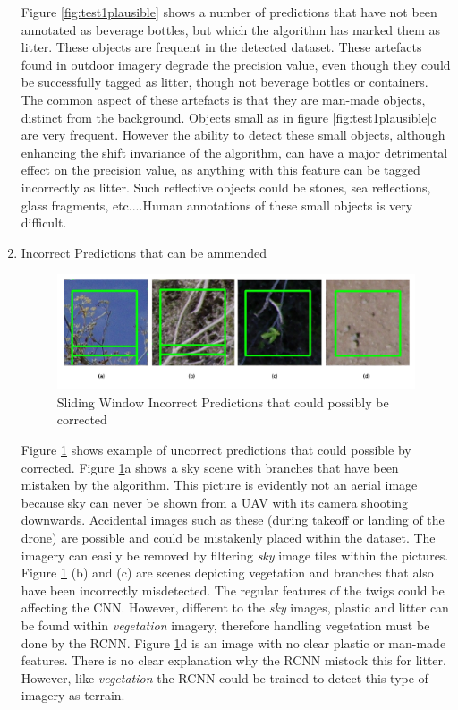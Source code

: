 \documentclass{IEEEtran}
\begin{document}
\begin{enumerate}
Figure \ref{fig:test1plausible} shows a number of predictions that have not been annotated as beverage bottles, but which the algorithm has marked them as litter. These objects are frequent in the detected dataset. These artefacts found in outdoor imagery degrade the precision value, even though they could be successfully tagged as litter, though not beverage bottles or containers. The common aspect of these artefacts is that they are man-made objects, distinct from the background. Objects small as in figure \ref{fig:test1plausible}c are very frequent. However the ability to detect these small objects, although enhancing the shift invariance of the algorithm, can have a major detrimental effect on the precision value, as anything with this feature can be tagged incorrectly as litter. Such reflective objects could be stones, sea reflections, glass fragments, etc....Human annotations of these small objects is very difficult.

\item Incorrect Predictions that can be ammended
\begin{figure}[H]
\centering
\includegraphics[scale=0.4]{images/test1-correctable.png}
\caption{Sliding Window Incorrect Predictions that could possibly be corrected}
\label{fig:test1correctable}
\end{figure}

Figure \ref{fig:test1correctable} shows example of uncorrect predictions that could possible by corrected. Figure \ref{fig:test1correctable}a shows a sky scene with branches that have been mistaken by the algorithm. This picture is evidently not an aerial image because sky can never be shown from a UAV with its camera shooting downwards. Accidental images such as these (during takeoff or landing of the drone) are possible and could be mistakenly placed within the dataset. The imagery can easily be removed by filtering \textit{sky} image tiles within the pictures. Figure \ref{fig:test1correctable} (b) and (c) are scenes  depicting vegetation and branches that also have been incorrectly misdetected. The regular features of the twigs could be affecting the CNN. However, different to the \textit{sky} images, plastic and litter can be found within \textit{vegetation} imagery, therefore handling vegetation must be done by the RCNN. Figure \ref{fig:test1correctable}d is an image with no clear plastic or man-made features. There is no clear explanation why the RCNN mistook this for litter. However, like \textit{vegetation} the RCNN could be trained to detect this type of imagery as terrain.


\end{enumerate}
\end{document}
